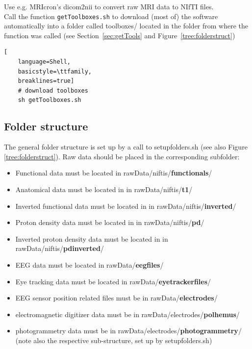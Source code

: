 \documentclass[12pt,a4paper]{scrartcl}
\begin{document}
\noindent Use e.g. MRIcron's dicom2nii to convert raw MRI data to NIfTI files.\\

\noindent Call the function \texttt{getToolboxes.sh} to download (most of) the software automatically into a folder called toolboxes/ located in the folder from where the function was called (see Section~\ref{sec:getTools} and Figure~\ref{tree:folderstruct})\\
\begin{lstlisting}[
    language=Shell,
    basicstyle=\ttfamily,
    breaklines=true]
    # download toolboxes
    sh getToolboxes.sh
\end{lstlisting}

\subsection{Folder structure}
\label{sec:dirstruct}
The general folder structure is set up by a call to setupfolders.sh (see also Figure \ref{tree:folderstruct}). Raw data should be placed in the corresponding subfolder:
\begin{itemize}
\item Functional data must be located in rawData/niftis/\textbf{functionals}/
\item Anatomical data must be located in in rawData/niftis/\textbf{t1}/
\item Inverted functional data must be located in in rawData/niftis/\textbf{inverted}/
\item Proton density data must be located in in rawData/niftis/\textbf{pd}/
\item Inverted proton density data must be located in in rawData/niftis/\textbf{pdinverted}/
\item EEG data must be located in rawData/\textbf{eegfiles}/
\item Eye tracking data must be located in rawData/\textbf{eyetrackerfiles}/
\item EEG sensor position related files must be in rawData/\textbf{electrodes}/
\item electromagnetic digitizer data must be in rawData/electrodes/\textbf{polhemus}/
\item photogrammetry data must be in rawData/electrodes/\textbf{photogrammetry}/ (note also the respective sub-structure, set up by setupfolders.sh)
\end{itemize}
\end{document}
